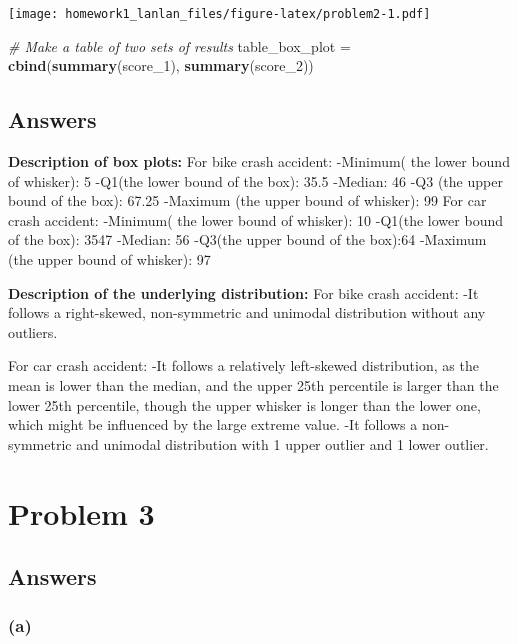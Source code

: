 \documentclass[
]{article}
\newenvironment{Shaded}{\begin{snugshade}}{\end{snugshade}}
\newcommand{\CommentTok}[1]{\textcolor[rgb]{0.56,0.35,0.01}{\textit{#1}}}
\newcommand{\FunctionTok}[1]{\textcolor[rgb]{0.13,0.29,0.53}{\textbf{#1}}}
\newcommand{\NormalTok}[1]{#1}
\newcommand{\OtherTok}[1]{\textcolor[rgb]{0.56,0.35,0.01}{#1}}
\begin{document}
\texttt{[image: homework1\_lanlan\_files/figure-latex/problem2-1.pdf]}

\begin{Shaded}
\begin{Highlighting}[]
\CommentTok{\# Make a table of two sets of results}
\NormalTok{table\_box\_plot }\OtherTok{=} \FunctionTok{cbind}\NormalTok{(}\FunctionTok{summary}\NormalTok{(score\_1), }\FunctionTok{summary}\NormalTok{(score\_2))}
\end{Highlighting}
\end{Shaded}

\subsection{Answers}\label{answers}

\textbf{Description of box plots:} For bike crash accident: -Minimum(
the lower bound of whisker): 5 -Q1(the lower bound of the box): 35.5
-Median: 46 -Q3 (the upper bound of the box): 67.25 -Maximum (the upper
bound of whisker): 99 For car crash accident: -Minimum( the lower bound
of whisker): 10 -Q1(the lower bound of the box): 3547 -Median: 56
-Q3(the upper bound of the box):64 -Maximum (the upper bound of
whisker): 97

\textbf{Description of the underlying distribution:} For bike crash
accident: -It follows a right-skewed, non-symmetric and unimodal
distribution without any outliers.

For car crash accident: -It follows a relatively left-skewed
distribution, as the mean is lower than the median, and the upper 25th
percentile is larger than the lower 25th percentile, though the upper
whisker is longer than the lower one, which might be influenced by the
large extreme value. -It follows a non-symmetric and unimodal
distribution with 1 upper outlier and 1 lower outlier.

\section{Problem 3}\label{problem-3}

\subsection{Answers}\label{answers-1}

\subsubsection{(a)}\label{a}
\end{document}
